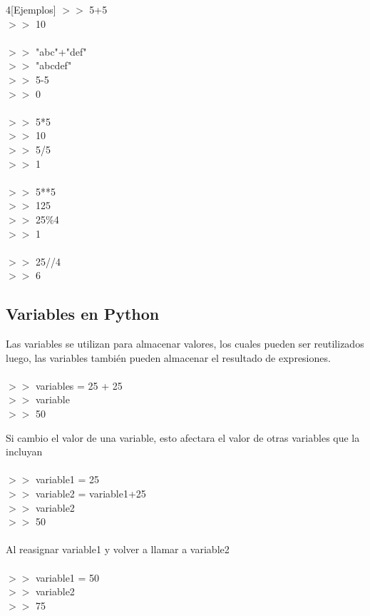 \documentclass[10pt,a4paper]{article}
\begin{document}
\begin{multicols}{4}[Ejemplos]
\noindent
$>>$ 5+5\\
$>>$ 10\\~\\
$>>$ "abc"+"def"\\
$>>$ "abcdef"\\
\vfill\null \columnbreak
\noindent
$>>$ 5-5\\
$>>$ 0\\~\\
$>>$ 5*5\\
$>>$ 10\\
\vfill\null \columnbreak
\noindent
$>>$ 5/5\\
$>>$ 1\\~\\
$>>$ 5**5\\
$>>$ 125\\
\vfill\null \columnbreak
\noindent
$>>$ 25\%4\\
$>>$ 1\\~\\
$>>$ 25//4\\
$>>$ 6
\end{multicols}


\subsection{Variables en Python}
Las variables se utilizan para almacenar valores, los cuales pueden ser reutilizados luego, las variables también pueden almacenar el resultado de expresiones.\\ \\
    \noindent
    $>>$ variables = 25 + 25\\
    $>>$ variable\\
    $>>$ 50

Si cambio el valor de una variable, esto afectara el valor de otras variables que la incluyan\\ \\
    \noindent
    $>>$ variable1 = 25\\
    $>>$ variable2 = variable1+25\\
    $>>$ variable2\\
    $>>$ 50\\ \\
    Al reasignar variable1 y volver a llamar a variable2\\ \\
    $>>$ variable1 = 50\\
    $>>$ variable2\\
    $>>$ 75
\end{document}
